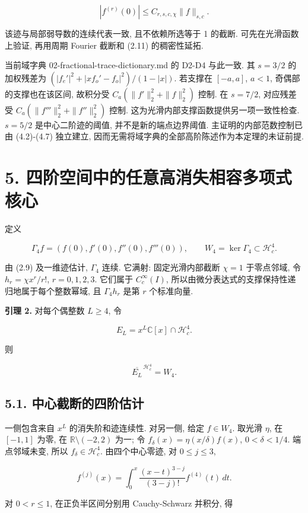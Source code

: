 \documentclass[UTF8,fontset=fandol,11pt,a4paper]{ctexart}
\begin{document}
\[
 |f^{(r)}(0)|\le C_{r,s,c,\chi}\|f\|_{s,c}.
 \tag{4.9}
\]


该迹与局部弱导数的连续代表一致, 且不依赖所选等于 1 的截断. 可先在光滑函数上验证, 再用周期 Fourier 截断和 (2.11) 的稠密性延拓.


当前域字典 02-fractional-trace-dictionary.md 的 D2-D4 与此一致. 其 \(s=3/2\) 的加权残差为
\((|f_e'|^2+|xf_o'-f_o|^2)/(1-|x|)\).
若支撑在 \([-a,a]\), \(a<1\), 奇偶部的支撑也在该区间, 故积分受
\(C_a(\|f'\|_2^2+\|f\|_2^2)\) 控制. 在 \(s=7/2\), 对应残差受
\(C_a(\|f'''\|_2^2+\|f''\|_2^2)\) 控制. 这为光滑内部支撑函数提供另一项一致性检查. \(s=5/2\) 是中心二阶迹的阈值, 并不是新的端点边界阈值. 主证明的内部范数控制已由 (4.2)-(4.7) 独立建立, 因而无需将域字典的全部高阶陈述作为本定理的未证前提.


\section*{5. 四阶空间中的任意高消失相容多项式核心}

定义


\[
 \Gamma_4 f=(f(0),f'(0),f''(0),f'''(0)),\qquad
 W_4=\ker\Gamma_4\subset\mathcal H_c^4.
 \tag{5.1}
\]


由 (2.9) 及一维迹估计, \(\Gamma_4\) 连续. 它满射: 固定光滑内部截断 \(\chi=1\) 于零点邻域, 令
\(h_r=\chi x^r/r!\), \(r=0,1,2,3\). 它们属于 \(C_c^\infty(I)\), 所以由微分表达式的支撑保持性递归地属于每个整数幂域, 且 \(\Gamma_4h_r\) 是第 \(r\) 个标准向量.


\textbf{引理 2.} 对每个偶整数 \(L\ge4\), 令


\[
 E_L=x^L\mathbb C[x]\cap\mathcal H_c^4.
\]


则


\[
 \boxed{\overline{E_L}^{\,\mathcal H_c^4}=W_4.}
 \tag{5.2}
\]


\subsection*{5.1. 中心截断的四阶估计}

一侧包含来自 \(x^L\) 的消失阶和迹连续性. 对另一侧, 给定 \(f\in W_4\). 取光滑 \(\eta\), 在 \([-1,1]\) 为零, 在 \(\mathbb R\setminus(-2,2)\) 为一; 令
\(f_\delta(x)=\eta(x/\delta)f(x)\), \(0<\delta<1/4\).
端点邻域未变, 所以 \(f_\delta\in\mathcal H_c^4\). 由四个中心零迹, 对 \(0\le j\le3\),


\[
 f^{(j)}(x)=\int_0^x
       \frac{(x-t)^{3-j}}{(3-j)!}f^{(4)}(t)\,dt.
 \tag{5.3}
\]


对 \(0<r\le1\), 在正负半区间分别用 Cauchy-Schwarz 并积分, 得
\end{document}
